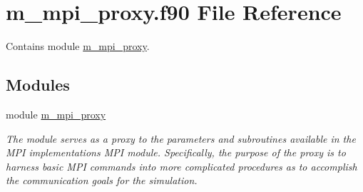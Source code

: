 \hypertarget{m__mpi__proxy_8f90}{}\section{m\+\_\+mpi\+\_\+proxy.\+f90 File Reference}
\label{m__mpi__proxy_8f90}


Contains module \hyperlink{namespacem__mpi__proxy}{m\+\_\+mpi\+\_\+proxy}.  


\subsection*{Modules}
\begin{DoxyCompactItemize}
\item 
module \hyperlink{namespacem__mpi__proxy}{m\+\_\+mpi\+\_\+proxy}
\begin{DoxyCompactList}\small\item\em The module serves as a proxy to the parameters and subroutines available in the M\+PI implementation\textquotesingle{}s M\+PI module. Specifically, the purpose of the proxy is to harness basic M\+PI commands into more complicated procedures as to accomplish the communication goals for the simulation. \end{DoxyCompactList}\end{DoxyCompactItemize}
